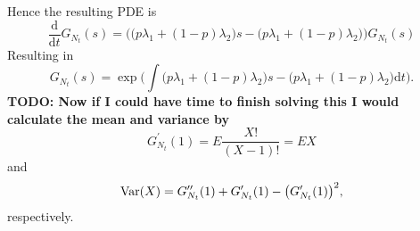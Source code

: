 \documentclass[10pt]{amsart}
\newcommand{\D}{\mathrm{d}}
\begin{document}
Hence the resulting PDE is 
$$
\frac {\D }{\D t} G_{N_t}(s) = \Bigg( \Big( p\lambda_1 + (1 - p)\lambda_2 \Big) s -  \Big( p \lambda_1 + (1 - p)\lambda_2 \Big) \Bigg) G_{N_t}(s)
$$
Resulting in
$$
G_{N_t}(s) = \exp \Bigg( \int \Big( p\lambda_1 + (1 - p)\lambda_2 \Big) s -  \Big( p \lambda_1 + (1 - p)\lambda_2 \Big) \D t \Bigg).
$$
\textbf{TODO: Now if I could have time to finish solving this I would calculate the mean and variance by}
$$
G_{N_t}^\prime(1) = E \frac {X!}{(X - 1)!} = E X
$$
and
$$
{\rm Var}(X) = G_{N_t}^{\prime\prime}(1) + G_{N_t}^\prime(1) - \big( G_{N_t}^\prime(1)\big)^2,
$$
respectively.
\end{document}
